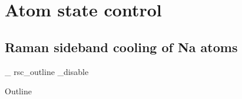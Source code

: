 \documentclass{beamer}
\newcommand\ifSlide[1]{
    \expandafter\ifcsname slide_ #1 _disable \endcsname
    \else
  }
\newcommand\ifSlide[1]{
    \expandafter\ifcsname slide_ #1 _enable \endcsname
  }
\begin{document}
\fi

\section{Atom state control}
\subsection{Raman sideband cooling of Na atoms}
\ifSlide{rsc_outline}
\begin{frame}{Outline}
\end{frame}
\fi

\end{document}

